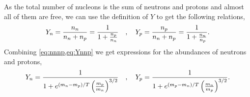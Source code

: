 As the total number of nucleons is the sum of neutrons and protons and almost all of them are free, we can use the definition of $Y$ to get the following relations,
\begin{align}
    Y_n=\frac{n_n}{n_n+n_p}=\frac{1}{1+\frac{n_p}{n_n}}\quad , \quad Y_p=\frac{n_p}{n_n+n_p}=\frac{1}{1+\frac{n_n}{n_p}}.
    \label{eq:Ynnp}
\end{align}
Combining \cref{eq:nnnp,eq:Ynnp} we get expressions for the abundances of neutrons and protons,
\begin{align}
    Y_n=\frac{1}{1+e^{(m_n-m_p)/T} \left( \frac{m_p}{ m_n} \right)^{3/2}} \quad , \quad Y_p=\frac{1}{1+e^{(m_p-m_n)/T} \left( \frac{m_n}{ m_p} \right)^{3/2}}.
\end{align}